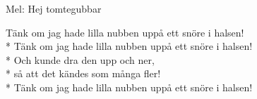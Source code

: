 \begin{SongText}[Snöret]
    \begin{SongInfo}
        Mel: Hej tomtegubbar
    \end{SongInfo}
    \begin{SongVerse}
        Tänk om jag hade lilla nubben uppå ett snöre i halsen!\\*%
        Tänk om jag hade lilla nubben uppå ett snöre i halsen!\\*%
        Och kunde dra den upp och ner,\\*%
        så att det kändes som många fler!\\*%
        Tänk om jag hade lilla nubben uppå ett snöre i halsen!
    \end{SongVerse}
\end{SongText}
